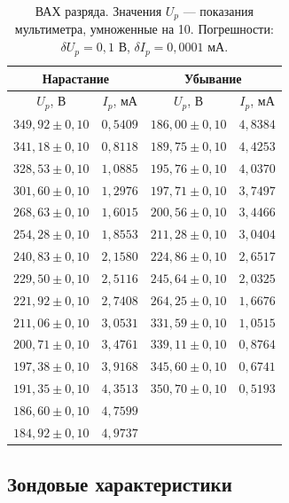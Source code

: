 \documentclass[a4paper]{article}
\begin{document}
	\begin{table}[h]
		\centering
		\caption{ВАХ разряда. Значения $U_p$ — показания мультиметра, умноженные на 10. Погрешности: $\delta U_p = 0{,}1$ В, $\delta I_p = 0{,}0001$ мА.}
		\label{tab:VAC}
		\begin{tabular}{|c|c||c|c|}
			\hline
			\multicolumn{2}{|c||}{Нарастание} & \multicolumn{2}{c|}{Убывание} \\
			\hline
			$U_p$, В & $I_p$, мА & $U_p$, В & $I_p$, мА \\
			\hline
			$349{,}92 \pm 0{,}10$ & $0{,}5409$ & $186{,}00 \pm 0{,}10$ & $4{,}8384$ \\
			$341{,}18 \pm 0{,}10$ & $0{,}8118$ & $189{,}75 \pm 0{,}10$ & $4{,}4253$ \\
			$328{,}53 \pm 0{,}10$ & $1{,}0885$ & $195{,}76 \pm 0{,}10$ & $4{,}0370$ \\
			$301{,}60 \pm 0{,}10$ & $1{,}2976$ & $197{,}71 \pm 0{,}10$ & $3{,}7497$ \\
			$268{,}63 \pm 0{,}10$ & $1{,}6015$ & $200{,}56 \pm 0{,}10$ & $3{,}4466$ \\
			$254{,}28 \pm 0{,}10$ & $1{,}8553$ & $211{,}28 \pm 0{,}10$ & $3{,}0404$ \\
			$240{,}83 \pm 0{,}10$ & $2{,}1580$ & $224{,}86 \pm 0{,}10$ & $2{,}6517$ \\
			$229{,}50 \pm 0{,}10$ & $2{,}5116$ & $245{,}64 \pm 0{,}10$ & $2{,}0325$ \\
			$221{,}92 \pm 0{,}10$ & $2{,}7408$ & $264{,}25 \pm 0{,}10$ & $1{,}6676$ \\
			$211{,}06 \pm 0{,}10$ & $3{,}0531$ & $331{,}59 \pm 0{,}10$ & $1{,}0515$ \\
			$200{,}71 \pm 0{,}10$ & $3{,}4761$ & $339{,}11 \pm 0{,}10$ & $0{,}8764$ \\
			$197{,}38 \pm 0{,}10$ & $3{,}9168$ & $345{,}60 \pm 0{,}10$ & $0{,}6741$ \\
			$191{,}35 \pm 0{,}10$ & $4{,}3513$ & $350{,}70 \pm 0{,}10$ & $0{,}5193$ \\
			$186{,}60 \pm 0{,}10$ & $4{,}7599$ & & \\
			$184{,}92 \pm 0{,}10$ & $4{,}9737$ & & \\
			\hline
		\end{tabular}
	\end{table}
	
	\subsection{Зондовые характеристики}
	
\end{document}
